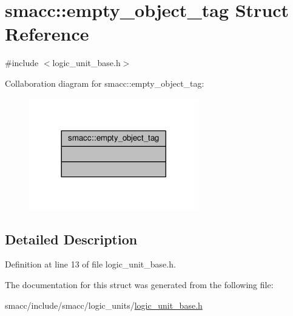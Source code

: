 \hypertarget{structsmacc_1_1empty__object__tag}{}\section{smacc\+:\+:empty\+\_\+object\+\_\+tag Struct Reference}
\label{structsmacc_1_1empty__object__tag}


{\ttfamily \#include $<$logic\+\_\+unit\+\_\+base.\+h$>$}



Collaboration diagram for smacc\+:\+:empty\+\_\+object\+\_\+tag\+:
\nopagebreak
\begin{figure}[H]
\begin{center}
\leavevmode
\includegraphics[width=209pt]{structsmacc_1_1empty__object__tag__coll__graph}
\end{center}
\end{figure}


\subsection{Detailed Description}


Definition at line 13 of file logic\+\_\+unit\+\_\+base.\+h.



The documentation for this struct was generated from the following file\+:\begin{DoxyCompactItemize}
\item 
smacc/include/smacc/logic\+\_\+units/\hyperlink{logic__unit__base_8h}{logic\+\_\+unit\+\_\+base.\+h}\end{DoxyCompactItemize}
